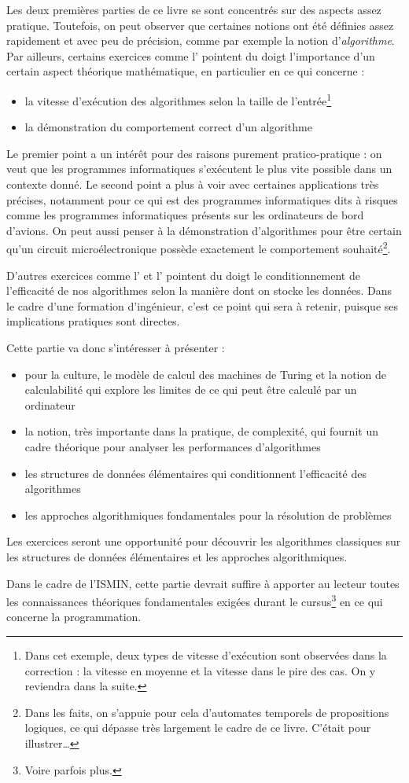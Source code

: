 \documentclass[../../main.tex]{subfiles}
\begin{document}
Les deux premières parties de ce livre se sont concentrés sur des aspects assez pratique. Toutefois, on peut observer que certaines notions ont été définies assez rapidement et avec peu de précision, comme par exemple la notion d'\textit{algorithme}. Par ailleurs, certains exercices comme l' pointent du doigt l'importance d'un certain aspect théorique mathématique, en particulier en ce qui concerne :
\begin{itemize}
	\item la vitesse d'exécution des algorithmes selon la taille de l'entrée\footnote{Dans cet exemple, deux types de vitesse d'exécution sont observées dans la correction : la vitesse en moyenne et la vitesse dans le pire des cas. On y reviendra dans la suite.}
	\item la démonstration du comportement correct d'un algorithme
\end{itemize}
Le premier point a un intérêt pour des raisons purement pratico-pratique : on veut que les programmes informatiques s'exécutent le plus vite possible dans un contexte donné. Le second point a plus à voir avec certaines applications très précises, notamment pour ce qui est des programmes informatiques dits \og à risques \fg comme les programmes informatiques présents sur les ordinateurs de bord d'avions. On peut aussi penser à la démonstration d'algorithmes pour être certain qu'un circuit microélectronique possède exactement le comportement souhaité\footnote{Dans les faits, on s'appuie pour cela d'automates temporels de propositions logiques, ce qui dépasse très largement le cadre de ce livre. C'était pour illustrer\dots}.

D'autres exercices comme l' et l' pointent du doigt le conditionnement de l'efficacité de nos algorithmes selon la manière dont on stocke les données. Dans le cadre d'une formation d'ingénieur, c'est ce point qui sera à retenir, puisque ses implications pratiques sont directes.

Cette partie va donc s'intéresser à présenter :
\begin{itemize}
	\item pour la culture, le modèle de calcul des machines de Turing et la notion de calculabilité qui explore les limites de ce qui peut être calculé par un ordinateur
	\item la notion, très importante dans la pratique, de complexité, qui fournit un cadre théorique pour analyser les performances d'algorithmes
	\item les structures de données élémentaires qui conditionnent l'efficacité des algorithmes
	\item les approches algorithmiques fondamentales pour la résolution de problèmes
\end{itemize}
Les exercices seront une opportunité pour découvrir les algorithmes classiques sur les structures de données élémentaires et les approches algorithmiques.

Dans le cadre de l'ISMIN, cette partie devrait suffire à apporter au lecteur toutes les connaissances théoriques fondamentales exigées durant le cursus\footnote{Voire parfois plus.} en ce qui concerne la programmation.
\end{document}
